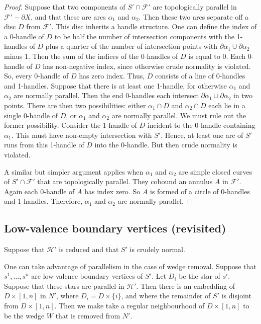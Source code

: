 \documentclass[oneside]{amsart}
\numberwithin{equation}{section}
\theoremstyle{plain}
\theoremstyle{definition}
\newcommand{\calF}{\mathcal{F}}
\begin{document}
\begin{proof}
Suppose that two components of $S' \cap \calF'$ are topologically parallel in $\mathcal{F}' - \partial X$, 
and that these are arcs $\alpha_1$ and $\alpha_2$. Then these
two arcs separate off a disc $D$ from $\mathcal{F}'$. This disc inherits a handle
structure. One can define the index of a 0-handle of $D$ to be half the number of
intersection components with the 1-handles of $D$ plus a quarter of the number of
intersection points with $\partial \alpha_1 \cup \partial \alpha_2$ minus 1.
Then the sum of the indices of the 0-handles of $D$ is equal to 0.
Each 0-handle of $D$ has non-negative index, since otherwise crude
normality is violated. So, every 0-handle of $D$ has zero index. Thus, $D$ consists
of a line of 0-handles and 1-handles. Suppose that there is at
least one 1-handle, for otherwise $\alpha_1$ and $\alpha_2$ are normally parallel.
Then the end 0-handles
each intersect $\partial \alpha_1 \cup \partial \alpha_2$ in two points.
There are then two possibilities: either $\alpha_1 \cap D$ and $\alpha_2 \cap D$
each lie in a single 0-handle of $D$, or $\alpha_1$ and $\alpha_2$ are normally parallel.
We must rule out the former possibility. Consider the 1-handle of $D$ incident to
the 0-handle containing $\alpha_1$. This must have non-empty intersection with $S'$.
Hence, at least one arc of $S'$ runs from this 1-handle of $D$ into the 0-handle.
But then crude normality is violated.

A similar but simpler argument applies when $\alpha_1$ and $\alpha_2$ are simple
closed curves of $S' \cap \calF'$ that are topologically parallel. They cobound an
annulus $A$ in $\calF'$. Again each 0-handle of $A$ has index zero. So $A$ is formed
of a circle of 0-handles and 1-handles. Therefore, $\alpha_1$ and $\alpha_2$ are
normally parallel.
\end{proof}


\subsection{Low-valence boundary vertices (revisited)}

Suppose that $\mathcal{H}'$ is reduced and that $S'$ is crudely normal. 

One can take advantage of parallelism in the case of wedge removal. Suppose that
$s^1, \dots, s^n$ are low-valence boundary vertices of $S'$. Let $D_i$ be the star of $s^i$. Suppose
that these stars are parallel in $\mathcal{H}'$. Then there is an embedding of $D \times [1,n]$ in
$N'$, where $D_i = D \times \{ i \}$, and where the remainder of $S'$ is disjoint from $D \times [1,n]$.
Then we make take a regular neighbourhood of $D \times [1,n]$ to be the wedge $W$ that is
removed from $N'$. 
\end{document}
